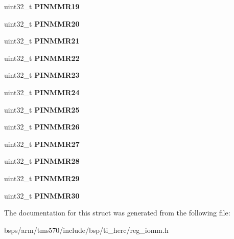 \begin{DoxyCompactItemize}
uint32\+\_\+t {\bfseries P\+I\+N\+M\+M\+R19}
\item 
\mbox{\label{structtms570__pinmux__t_a7d299b6a7d30c65df844a34b611af82a}} 
uint32\+\_\+t {\bfseries P\+I\+N\+M\+M\+R20}
\item 
\mbox{\label{structtms570__pinmux__t_a7f89a4099cb0b64994fc1da850259acd}} 
uint32\+\_\+t {\bfseries P\+I\+N\+M\+M\+R21}
\item 
\mbox{\label{structtms570__pinmux__t_a78fed50d4c038b8c981a680b17baedc2}} 
uint32\+\_\+t {\bfseries P\+I\+N\+M\+M\+R22}
\item 
\mbox{\label{structtms570__pinmux__t_adafc43d4277bda9f1039cfe9e0f2e8e9}} 
uint32\+\_\+t {\bfseries P\+I\+N\+M\+M\+R23}
\item 
\mbox{\label{structtms570__pinmux__t_a42b4bb83f996f142e0fa49addaffbc27}} 
uint32\+\_\+t {\bfseries P\+I\+N\+M\+M\+R24}
\item 
\mbox{\label{structtms570__pinmux__t_acc13b8c86a071d0dab07429121f6484f}} 
uint32\+\_\+t {\bfseries P\+I\+N\+M\+M\+R25}
\item 
\mbox{\label{structtms570__pinmux__t_afa20c047912c2ddbc0647b4066ecd6b5}} 
uint32\+\_\+t {\bfseries P\+I\+N\+M\+M\+R26}
\item 
\mbox{\label{structtms570__pinmux__t_a7609ed0f18f5b2a13ee1e45de8b63ba8}} 
uint32\+\_\+t {\bfseries P\+I\+N\+M\+M\+R27}
\item 
\mbox{\label{structtms570__pinmux__t_a1011afaf55514e863881c94fc4dd6ccd}} 
uint32\+\_\+t {\bfseries P\+I\+N\+M\+M\+R28}
\item 
\mbox{\label{structtms570__pinmux__t_a12cda23d0ca146bebddd490d5b6133df}} 
uint32\+\_\+t {\bfseries P\+I\+N\+M\+M\+R29}
\item 
\mbox{\label{structtms570__pinmux__t_a37875f13b747628788b755f36be3dec5}} 
uint32\+\_\+t {\bfseries P\+I\+N\+M\+M\+R30}
\end{DoxyCompactItemize}


The documentation for this struct was generated from the following file\+:\begin{DoxyCompactItemize}
\item 
bsps/arm/tms570/include/bsp/ti\+\_\+herc/reg\+\_\+iomm.\+h\end{DoxyCompactItemize}
